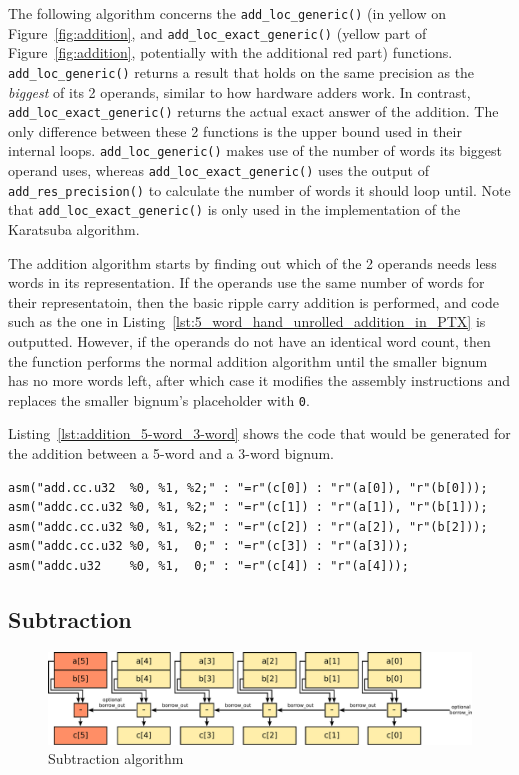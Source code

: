 \documentclass[10pt, a4paper]{report}
\begin{document}
The following algorithm concerns the \verb+add_loc_generic()+ (in yellow on
Figure~\ref{fig:addition}, and \verb+add_loc_exact_generic()+ (yellow part of
Figure~\ref{fig:addition}, potentially with the additional red part) functions.
\verb+add_loc_generic()+ returns a result that holds on the same precision as
the \emph{biggest} of its 2 operands, similar to how hardware adders work.
In contrast, \verb+add_loc_exact_generic()+ returns the actual exact answer of
the addition. The only difference between these 2 functions is the upper bound
used in their internal loops. \verb+add_loc_generic()+ makes use of the number
of words its biggest operand uses, whereas \verb+add_loc_exact_generic()+ uses
the output of \verb+add_res_precision()+ to calculate the number of words it
should loop until.
Note that \verb+add_loc_exact_generic()+ is only used in the implementation of
the Karatsuba algorithm.

The addition algorithm starts by finding out which of the 2 operands needs less
words in its representation.
If the operands use the same number of words for their representatoin, then the
basic ripple carry addition is performed, and code such as the one in
Listing~\ref{lst:5_word_hand_unrolled_addition_in_PTX} is outputted.
However, if the operands do not have an identical word count, then the function
performs the normal addition algorithm until the smaller bignum has no more
words left, after which case it modifies the assembly instructions and replaces
the smaller bignum's placeholder with \verb+0+.

Listing~\ref{lst:addition_5-word_3-word} shows the code that would be generated
for the addition between a 5-word and a 3-word bignum.

\begin{lstlisting}
asm("add.cc.u32  %0, %1, %2;" : "=r"(c[0]) : "r"(a[0]), "r"(b[0]));
asm("addc.cc.u32 %0, %1, %2;" : "=r"(c[1]) : "r"(a[1]), "r"(b[1]));
asm("addc.cc.u32 %0, %1, %2;" : "=r"(c[2]) : "r"(a[2]), "r"(b[2]));
asm("addc.cc.u32 %0, %1,  0;" : "=r"(c[3]) : "r"(a[3]));
asm("addc.u32    %0, %1,  0;" : "=r"(c[4]) : "r"(a[4]));
\end{lstlisting}

\subsection{Subtraction}
\begin{figure}[h]
\centering
\includegraphics[width=\linewidth]{figs/subtraction}
\caption{Subtraction algorithm}
\label{fig:subtraction}
\end{figure}
\end{document}
